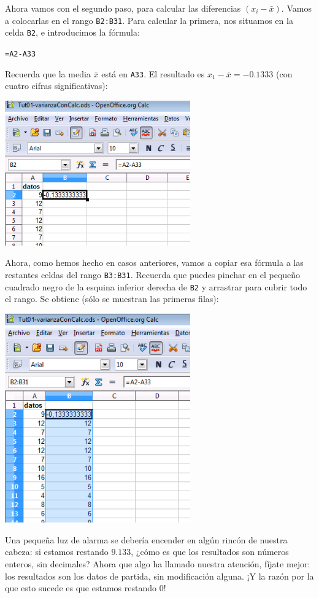\documentclass[10pt,a4paper]{article}\usepackage[]{graphicx}\usepackage[]{color}
\begin{document}
Ahora vamos con el segundo paso, para calcular las diferencias $(x_i-\bar x)$. Vamos a colocarlas en el rango {\tt B2:B31}. Para calcular la primera, nos situamos en la celda {\tt B2}, e introducimos la fórmula:
\begin{center}
{\tt =A2-A33}
\end{center}
Recuerda que la media $\bar x$ está en {\tt A33}. El resultado es $x_1-\bar x=-0.1333$ (con cuatro cifras significativas):
    \begin{center}
    \includegraphics[width=8cm]{../fig/Tut02-47.png}
    \end{center}
Ahora, como hemos hecho en casos anteriores, vamos a copiar esa fórmula a las restantes celdas del rango {\tt B3:B31}. Recuerda que puedes pinchar en el pequeño cuadrado negro de la esquina inferior derecha de {\tt B2} y arrastrar para cubrir todo el rango. Se obtiene (sólo se muestran las primeras filas):
    \begin{center}
    \includegraphics[width=8cm]{../fig/Tut02-48.png}
    \end{center}
Una pequeña luz de alarma se debería encender en algún rincón de nuestra cabeza: si estamos restando $9.133$, ¿cómo es que los resultados son números enteros, sin decimales? Ahora que algo ha llamado nuestra atención, fíjate mejor: los resultados son los datos de partida, sin modificación alguna. ¡Y la razón por la que esto sucede es que estamos restando 0!
\end{document}
